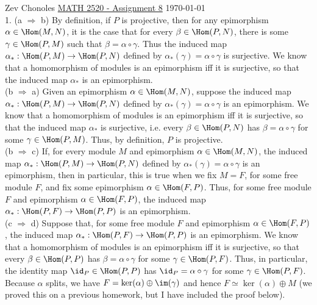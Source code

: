 \documentclass[11pt]{article}
\begin{document}
Zev Chonoles \hfill 
\underline{MATH 2520 - Assignment 8} \hfill \today\\

\num{1.} (a $\Rightarrow$ b) By definition, if $P$ is
projective, then for any epimorphism $\alpha\in\Hom(M,N)$, it
is the case that for every $\beta\in\Hom(P,N)$, there is some
$\gamma\in\Hom(P,M)$ such that $\beta=\alpha\circ\gamma$. Thus
the induced map $\alpha_*:\Hom(P,M)\rightarrow\Hom(P,N)$ defined
by $\alpha_*(\gamma)=\alpha\circ\gamma$ is surjective. We know that a
homomorphism of modules is an epimorphism iff it is surjective, so that the
induced map $\alpha_*$ is an epimorphism.\\

(b $\Rightarrow$ a) Given an epimorphism $\alpha\in\Hom(M,N)$, suppose
the induced map $\alpha_*:\Hom(P,M)\rightarrow\Hom(P,N)$ defined by
$\alpha_*(\gamma)=\alpha\circ\gamma$ is an epimorphism. We know that a
homomorphism of modules is an epimorphism iff it is surjective, so that the
induced map $\alpha_*$ is surjective, i.e. every $\beta\in\Hom(P,N)$ has
$\beta=\alpha\circ\gamma$ for some $\gamma\in\Hom(P,M)$. Thus, by definition,
$P$ is projective.\\

(b $\Rightarrow$ c) If, for every module $M$ and epimorphism
$\alpha\in\Hom(M,N)$, the induced map $\alpha_*:\Hom(P,M)\rightarrow\Hom(P,N)$
defined by $\alpha_*(\gamma)=\alpha\circ\gamma$ is an epimorphism, then
in particular, this is true when we fix $M=F$, for some free module
$F$, and fix some epimorphism $\alpha\in\Hom(F,P)$. Thus, for some
free module $F$ and epimorphism $\alpha\in\Hom(F,P)$, the induced map
$\alpha_*:\Hom(P,F)\rightarrow\Hom(P,P)$ is an epimorphism.\\

(c $\Rightarrow$ d) Suppose that, for some free module $F$ and epimorphism
$\alpha\in\Hom(F,P)$, the induced map $\alpha_*:\Hom(P,F)\rightarrow\Hom(P,P)$
is an epimorphism. We know that a homomorphism of modules is an
epimorphism iff it is surjective, so that every $\beta\in\Hom(P,P)$ has
$\beta=\alpha\circ\gamma$ for some $\gamma\in\Hom(P,F)$. Thus, in particular,
the identity map $\id_P\in\Hom(P,P)$ has $\id_P=\alpha\circ\gamma$
for some $\gamma\in\Hom(P,F)$. Because $\alpha$ splits, we have
$F=\ker(\alpha)\oplus\im(\gamma)$ and hence $F\simeq\ker(\alpha)\oplus M$ (we
proved this on a previous homework, but I have included the proof below).\\
\end{document}
